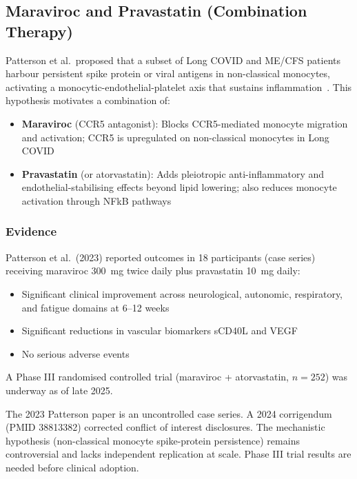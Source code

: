 \subsection{Maraviroc and Pravastatin (Combination Therapy)}
\label{subsec:maraviroc-pravastatin}

Patterson et al.\ proposed that a subset of Long COVID and ME/CFS patients harbour persistent spike protein or viral antigens in non-classical monocytes, activating a monocytic-endothelial-platelet axis that sustains inflammation~\cite{Patterson2023maraviroc}. This hypothesis motivates a combination of:
\begin{itemize}
    \item \textbf{Maraviroc} (CCR5 antagonist): Blocks CCR5-mediated monocyte migration and activation; CCR5 is upregulated on non-classical monocytes in Long COVID
    \item \textbf{Pravastatin} (or atorvastatin): Adds pleiotropic anti-inflammatory and endothelial-stabilising effects beyond lipid lowering; also reduces monocyte activation through NFkB pathways
\end{itemize}

\subsubsection{Evidence}

Patterson et al.\ (2023) reported outcomes in 18 participants (case series) receiving maraviroc 300~mg twice daily plus pravastatin 10~mg daily:
\begin{itemize}
    \item Significant clinical improvement across neurological, autonomic, respiratory, and fatigue domains at 6--12 weeks
    \item Significant reductions in vascular biomarkers sCD40L and VEGF
    \item No serious adverse events
\end{itemize}

A Phase III randomised controlled trial (maraviroc + atorvastatin, $n = 252$) was underway as of late 2025.

\begin{warning}
The 2023 Patterson paper is an uncontrolled case series. A 2024 corrigendum (PMID 38813382) corrected conflict of interest disclosures. The mechanistic hypothesis (non-classical monocyte spike-protein persistence) remains controversial and lacks independent replication at scale. Phase III trial results are needed before clinical adoption.
\end{warning}

